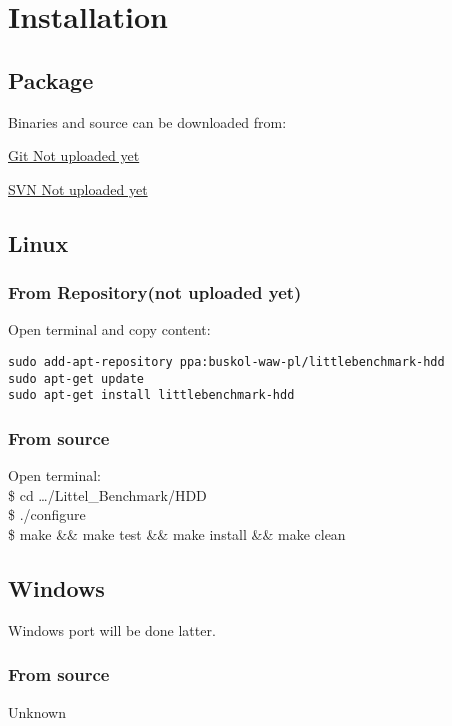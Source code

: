 \hypertarget{Installation}{
\section{Installation}
\label{Installation}
}

\subsection{Package}
Binaries and source can be downloaded from:
\begin{description}
\item \href{http://github.com/str0g/LittleBenchmark/tree/master/HDD/Release}{Git Not uploaded yet}
\item \href{https://subversion.assembla.com/svn/littlebenchmark-hdd/}{SVN Not uploaded yet}
\end{description}

\subsection{Linux}

\subsubsection{From Repository(not uploaded yet)}
Open terminal and copy content:
\begin{verbatim}
sudo add-apt-repository ppa:buskol-waw-pl/littlebenchmark-hdd
sudo apt-get update
sudo apt-get install littlebenchmark-hdd
\end{verbatim}

\subsubsection{From source}
Open terminal:\\
\$ cd \ldots/Littel\_Benchmark/HDD\\
\$ ./configure\\
\$ make \&\& make test \&\& make install \&\& make clean\\
\subsection{Windows}
Windows port will be done latter.
\subsubsection{From source}
Unknown 